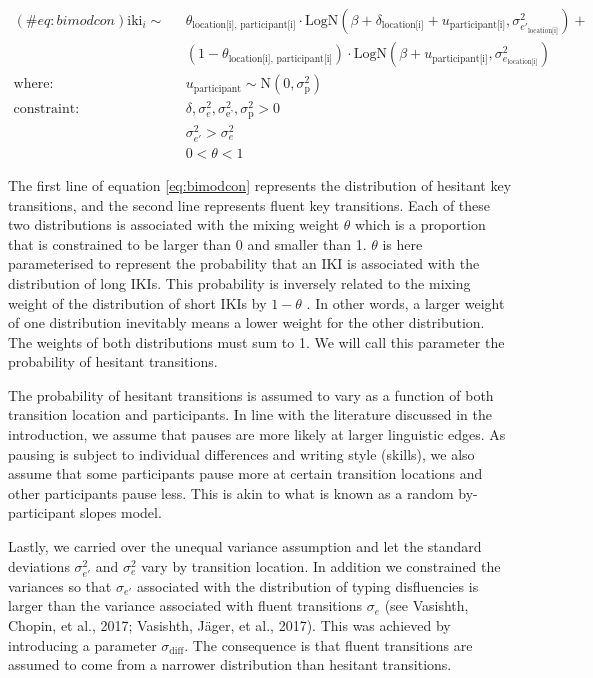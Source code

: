 \begin{appendix}
\begin{equation}
\begin{aligned}
(\#eq:bimodcon)
\text{iki}_{i} \sim\text{ } & \theta_\text{location[i], participant[i]} \cdot \text{LogN}(\beta + \delta_\text{location[i]} + u_\text{participant[i]}, \sigma_{e'_\text{location[i]}}^2) + \\
  & (1 - \theta_\text{location[i], participant[i]}) \cdot \text{LogN}(\beta + u_\text{participant[i]}, \sigma_{e_\text{location[i]}}^2)\\
\text{where: } & u_\text{participant} \sim \text{N}(0, \sigma_\text{p}^2) \\
\text{constraint: } & \delta, \sigma_{e}^2, \sigma_\text{e'}^2, \sigma_\text{p}^2>0\\
        & \sigma_{e'}^2 > \sigma_{e}^2\\
        & 0 < \theta < 1
\end{aligned}
\end{equation}

The first line of equation \ref{eq:bimodcon} represents the distribution
of hesitant key transitions, and the second line represents fluent key
transitions. Each of these two distributions is associated with the
mixing weight \(\theta\) which is a proportion that is constrained to be
larger than 0 and smaller than 1. \(\theta\) is here parameterised to
represent the probability that an IKI is associated with the
distribution of long IKIs. This probability is inversely related to the
mixing weight of the distribution of short IKIs by \(1-\theta\) . In
other words, a larger weight of one distribution inevitably means a
lower weight for the other distribution. The weights of both
distributions must sum to 1. We will call this parameter the probability
of hesitant transitions.

The probability of hesitant transitions is assumed to vary as a function
of both transition location and participants. In line with the
literature discussed in the introduction, we assume that pauses are more
likely at larger linguistic edges. As pausing is subject to individual
differences and writing style (skills), we also assume that some
participants pause more at certain transition locations and other
participants pause less. This is akin to what is known as a random
by-participant slopes model.

Lastly, we carried over the unequal variance assumption and let the
standard deviations \(\sigma_{e'}^2\) and \(\sigma_{e}^2\) vary by
transition location. In addition we constrained the variances so that
\(\sigma_{e'}\) associated with the distribution of typing disfluencies
is larger than the variance associated with fluent transitions
\(\sigma_e\) (see Vasishth, Chopin, et al., 2017; Vasishth, Jäger, et
al., 2017). This was achieved by introducing a parameter
\(\sigma_\text{diff}\). The consequence is that fluent transitions are
assumed to come from a narrower distribution than hesitant transitions.


\end{appendix}
